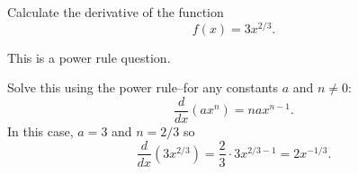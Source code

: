 \documentclass{ximera}
\author{Emma Smith Zbarsky}
\begin{document}
\begin{exercise}

Calculate the derivative of the function \[f(x) = 3x^{2/3}.\]


\begin{hint}
This is a power rule question.
\end{hint}


\begin{hint}
Solve this using the power rule--for any constants $a$ and $n \neq 0$:
\[\frac{d}{dx}\left(ax^n\right) = nax^{n-1}.\] In this case, $a=3$ and
$n=2/3$ so
\[\frac{d}{dx}\left(3x^{2/3}\right) = \frac{2}{3}\cdot 3 x^{2/3-1} = \boxed{2x^{-1/3}}.\]
\end{hint}


\begin{multipleChoice}
\end{multipleChoice}

\end{exercise}
\end{document}
